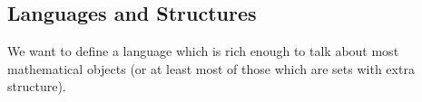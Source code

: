 \documentclass[11pt]{article}
\newcommand{\R}{\mathbb{R}}
\newcommand{\Z}{\mathbb{Z}}
\newcommand{\Q}{\mathbb{Q}}
\begin{document}
%
%
%
%
%
%
%
%
%
%


\subsection{Languages and Structures}

We want to define a language which is rich enough to talk about most mathematical objects (or at least most of those which are sets with extra structure).
\end{document}
